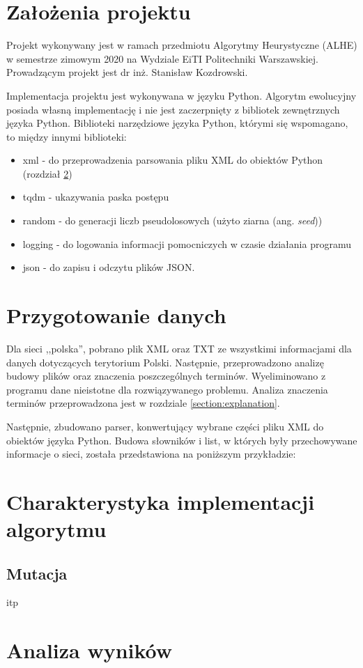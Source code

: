 \section{Założenia projektu}

Projekt wykonywany jest w ramach przedmiotu Algorytmy Heurystyczne (ALHE) w semestrze zimowym 2020 na Wydziale EiTI Politechniki Warszawskiej. Prowadzącym projekt jest dr inż. Stanisław Kozdrowski.

Implementacja projektu jest wykonywana w języku Python. Algorytm ewolucyjny posiada własną implementację i nie jest zaczerpnięty z bibliotek zewnętrznych języka Python. Biblioteki narzędziowe języka Python, którymi się wspomagano, to między innymi biblioteki:
\begin{itemize}
    \item xml - do przeprowadzenia parsowania pliku XML do obiektów Python (rozdział \ref{section:preparing})
    \item tqdm - ukazywania paska postępu
    \item random - do generacji liczb pseudolosowych (użyto ziarna (ang. \textit{seed}))
    \item logging - do logowania informacji pomocniczych w czasie działania programu
    \item json - do zapisu i odczytu plików JSON.
\end{itemize}

\section{Przygotowanie danych}
\label{section:preparing}

Dla sieci ,,polska'', pobrano plik XML oraz TXT ze wszystkimi informacjami dla danych dotyczących terytorium Polski. Następnie, przeprowadzono analizę budowy plików oraz znaczenia poszczególnych terminów. Wyeliminowano z programu dane nieistotne dla rozwiązywanego problemu. Analiza znaczenia terminów przeprowadzona jest w rozdziale \ref{section:explanation}.

Następnie, zbudowano parser, konwertujący wybrane części pliku XML do obiektów języka Python. Budowa słowników i list, w których były przechowywane informacje o sieci, została przedstawiona na poniższym przykładzie:


\section{Charakterystyka implementacji algorytmu}

\subsection{Mutacja}

itp

\section{Analiza wyników}

